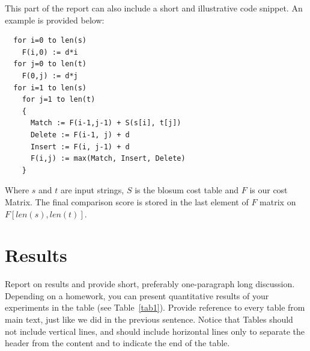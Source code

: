 \documentclass[a4paper,11pt]{article}
\begin{document}
This part of the report can also include a short and illustrative code snippet. An example is provided below:

\begin{lstlisting}
  for i=0 to len(s)
    F(i,0) := d*i
  for j=0 to len(t)
    F(0,j) := d*j
  for i=1 to len(s)
    for j=1 to len(t)
    {
      Match := F(i-1,j-1) + S(s[i], t[j])
      Delete := F(i-1, j) + d
      Insert := F(i, j-1) + d
      F(i,j) := max(Match, Insert, Delete)
    }
\end{lstlisting}
Where $s$ and $t$ are input strings, $S$ is the blosum cost table and $F$ is our cost Matrix. The final comparison score is stored in the last element of $F$ matrix on $F[len(s),len(t)]$.



\section{Results}

Report on results and provide short, preferably one-paragraph long discussion. Depending on a homework, you can present quantitative results of your experiments in the table (see Table~\ref{tab1}). Provide reference to every table from main text, just like we did in the previous sentence. Notice that Tables should not include vertical lines, and should include horizontal lines only to separate the header from the content and to indicate the end of the table.
\end{document}
